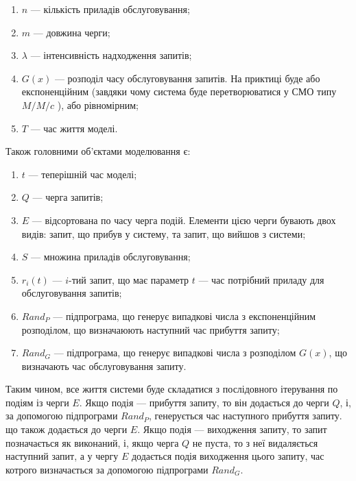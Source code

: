 \documentclass[14pt]{extarticle}
\begin{document}
\begin{enumerate}
  \item \(n\) --- кількість приладів обслуговування;
  \item \(m\) --- довжина черги;
  \item \(\lambda\) --- інтенсивність надходження запитів;
  \item \(G(x)\) --- розподіл часу обслуговування запитів. На приктиці буде або
        експоненційним (завдяки чому система буде перетворюватися у СМО типу
        \(M/M/c\) \cite{3}), або рівномірним;
  \item \(T\) --- час життя моделі.
\end{enumerate}

Також головними об\textquoteright єктами моделювання є:

\begin{enumerate}
  \item \(t\) --- теперішній час моделі;
  \item \(Q\) --- черга запитів;
  \item \(E\) --- відсортована по часу черга подій. Елементи цією черги бувають
        двох видів: запит, що прибув у систему, та запит, що вийшов з системи;
  \item \(S\) --- множина приладів обслуговування;
  \item \(r_{i}(t)\) --- \(i\)-тий запит, що має параметр \(t\) --- час потрібний
        приладу для обслуговування запитів;
  \item \(Rand_{P}\) --- підпрограма, що генерує випадкові числа з експоненційним
        розподілом, що визначаюють наступний час прибуття запиту;
  \item \(Rand_{G}\) --- підпрограма, що генерує випадкові числа з розподілом
        \(G(x)\), що визначають час обслуговування запиту.
\end{enumerate}

Таким чином, все життя системи буде складатися з послідовного ітерування по
подіям із черги \(E\). Якщо подія --- прибуття запиту, то він додається до черги
\(Q\), і, за допомогою підпрограми \(Rand_{P}\), генерується час наступного
прибуття запиту. що також додається до черги \(E\). Якщо подія --- виходження
запиту, то запит позначається як виконаний, і, якщо черга \(Q\) не пуста, то з
неї видаляється наступний запит, а у чергу \(E\) додається подія виходження
цього запиту, час котрого визначається за допомогою підпрограми \(Rand_{G}\).

\newpage
\end{document}
